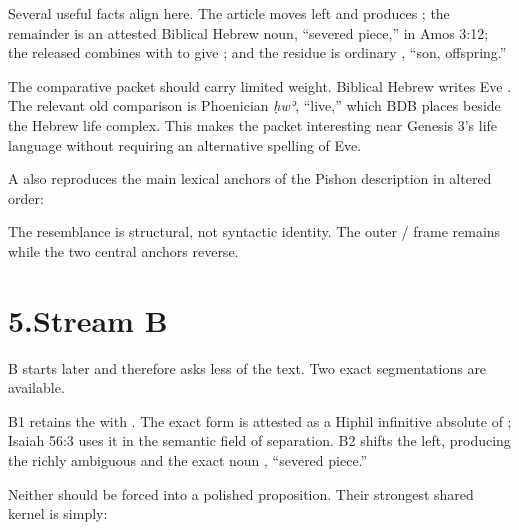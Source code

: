 Several useful facts align here. The article  moves left and produces ; the remainder  is an attested Biblical Hebrew noun, ``severed piece,'' in Amos 3:12; the released  combines with  to give ; and the residue is ordinary , ``son, offspring.''\cite{BDB}

The comparative packet  should carry limited weight. Biblical Hebrew writes Eve . The relevant old comparison is Phoenician \textit{ḥwʾ}, ``live,'' which BDB places beside the Hebrew life complex.\cite{BDB} This makes the packet interesting near Genesis 3's life language without requiring an alternative spelling of Eve.

A also reproduces the main lexical anchors of the Pishon description in altered order:


The resemblance is structural, not syntactic identity. The outer / frame remains while the two central anchors reverse.

\section*{5.\quad Stream B}

B starts later and therefore asks less of the text. Two exact segmentations are available.


B1 retains the  with . The exact form  is attested as a Hiphil infinitive absolute of ; Isaiah 56:3 uses it in the semantic field of separation.\cite{BDB,JouonMuraoka2006} B2 shifts the  left, producing the richly ambiguous  and the exact noun , ``severed piece.''

Neither should be forced into a polished proposition. Their strongest shared kernel is simply:

